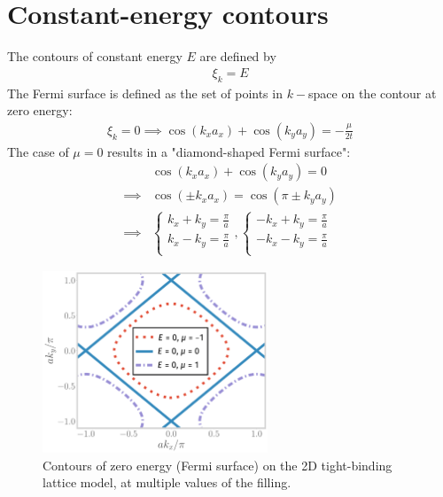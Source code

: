 \documentclass[12pt,onecolumn]{revtex4-2}
\begin{document}
\section{Constant-energy contours}
The contours of constant energy \(E\) are defined by
\begin{equation}\begin{aligned}
	\xi_k = E
\end{aligned}\end{equation}
The Fermi surface is defined as the set of points in $k-$space on the contour at zero energy:
\begin{equation}\begin{aligned}
	\xi_k = 0 \implies \cos(k_x a_x) + \cos(k_y a_y) = -\frac{\mu}{2t}
\end{aligned}\end{equation}
The case of \(\mu=0\) results in a "diamond-shaped Fermi surface":
\begin{equation}\begin{aligned}
	&\cos(k_x a_x) + \cos(k_y a_y) = 0\\
	\implies &\cos(\pm k_x a_x) = \cos(\pi \pm k_y a_y) \\
	\implies & \begin{cases}
		k_x + k_y = \frac{\pi}{a}\\
		k_x - k_y = \frac{\pi}{a}\\
	\end{cases},
	\begin{cases}
		-k_x + k_y = \frac{\pi}{a}\\
		-k_x - k_y = \frac{\pi}{a}\\
	\end{cases}
\end{aligned}\end{equation}
\begin{figure}[htpb]
	\centering
	\includegraphics[width=0.6\textwidth]{./tight-binding-contour.pdf}
	\caption{Contours of zero energy (Fermi surface) on the 2D tight-binding lattice model, at multiple values of the filling.}
\end{figure}
\end{document}
